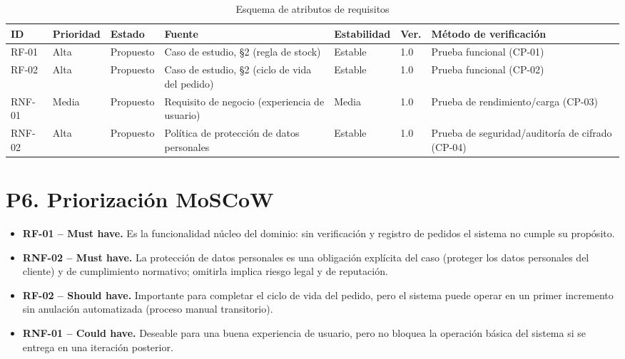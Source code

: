 \documentclass[12pt,a4paper]{article}
\begin{document}
    \begin{table}[H]
    \centering
    \small
    \begin{tabular}{@{}p{1.3cm}p{1.3cm}p{1.5cm}p{2.8cm}p{1.5cm}p{1cm}p{3.5cm}@{}}
    \toprule
    \textbf{ID} & \textbf{Prioridad} & \textbf{Estado} & \textbf{Fuente} & \textbf{Estabilidad} & \textbf{Ver.} & \textbf{Método de verificación} \\
    \midrule
    RF-01 & Alta & Propuesto & Caso de estudio, \S2 (regla de stock) & Estable & 1.0 & Prueba funcional (CP-01) \\
    RF-02 & Alta & Propuesto & Caso de estudio, \S2 (ciclo de vida del pedido) & Estable & 1.0 & Prueba funcional (CP-02) \\
    RNF-01 & Media & Propuesto & Requisito de negocio (experiencia de usuario) & Media & 1.0 & Prueba de rendimiento/carga (CP-03) \\
    RNF-02 & Alta & Propuesto & Política de protección de datos personales & Estable & 1.0 & Prueba de seguridad/auditoría de cifrado (CP-04) \\
    \bottomrule
    \end{tabular}
    \caption{Esquema de atributos de requisitos}
    \end{table}
    
    \section{P6. Priorización MoSCoW}
    
    \begin{itemize}[leftmargin=*]
        \item \textbf{RF-01 -- Must have.} Es la funcionalidad núcleo del dominio: sin verificación y registro de pedidos el sistema no cumple su propósito.
        \item \textbf{RNF-02 -- Must have.} La protección de datos personales es una obligación explícita del caso (proteger los datos personales del cliente) y de cumplimiento normativo; omitirla implica riesgo legal y de reputación.
        \item \textbf{RF-02 -- Should have.} Importante para completar el ciclo de vida del pedido, pero el sistema puede operar en un primer incremento sin anulación automatizada (proceso manual transitorio).
        \item \textbf{RNF-01 -- Could have.} Deseable para una buena experiencia de usuario, pero no bloquea la operación básica del sistema si se entrega en una iteración posterior.
    \end{itemize}
    
\end{document}
